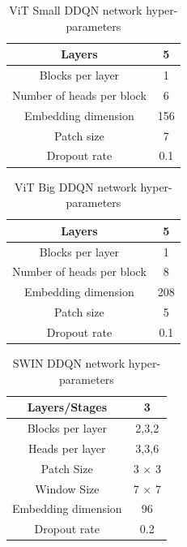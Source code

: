 \begin{table}[!h]
	\begin{center}
		\caption[ViT Small DDQN network hyper-parameters]{ViT Small DDQN network hyper-parameters}
		\label{tab:vit-small-hyper-parameters}
		\begin{tabular}{||c | c||} 
			\hline
			 Layers & 5 \\
			 \hline
			 Blocks per layer & 1 \\
			 \hline
			 Number of heads per block & 6 \\
			 \hline
			 Embedding dimension & 156 \\
			 \hline
			 Patch size & 7 \\
			 \hline
			 Dropout rate & 0.1 \\
			 \hline
		\end{tabular}
	\end{center}
\end{table}

\begin{table}[!h]
	\begin{center}
		\caption[ViT Big DDQN network hyper-parameters]{ViT Big DDQN network hyper-parameters}
		\label{tab:vit-big-hyper-parameters}
		\begin{tabular}{||c | c||} 
			\hline
			Layers & 5 \\  
			\hline
			Blocks per layer & 1 \\
			\hline
			Number of heads per block & 8 \\
			\hline
			Embedding dimension & 208 \\
			\hline
			Patch size & 5 \\
			\hline
			Dropout rate & 0.1 \\
			\hline
		\end{tabular}
	\end{center}
\end{table}

\begin{table}[!h]
	\begin{center}
		\caption[SWIN DDQN network hyper-parameters]{SWIN DDQN network hyper-parameters}
		\label{tab:swin-hyper-parameters}
		\begin{tabular}{||c | c||} 
			\hline
			Layers/Stages & 3 \\ 
			\hline
			Blocks per layer & 2,3,2 \\
			\hline
			Heads per layer & 3,3,6 \\
			\hline
			Patch Size & 3 $\times$ 3 \\
			\hline
			Window Size & 7 $\times$ 7 \\
			\hline
			Embedding dimension & 96 \\
			\hline
			Dropout rate & 0.2 \\
			\hline
		\end{tabular}
	\end{center}
\end{table}


